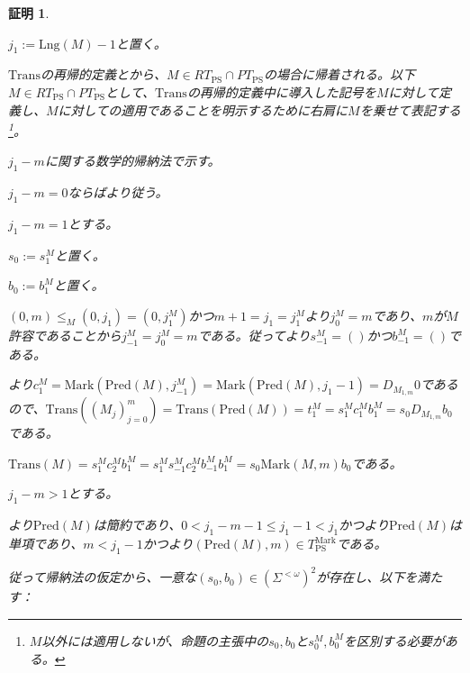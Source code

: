 \documentclass[dvipdfmx,uplatex]{jsarticle}
\theoremstyle{customnonumberbreakfortheorem}
\theoremstyle{customnonumberbreakforproof}
\newtheorem{hideableproof}{証明}
\begin{document}
\begin{hideableproof}
	\begin{indented}
		\item \(j_1 := \textrm{Lng}(M) - 1\)と置く。
		\item \(\textrm{Trans}\)の再帰的定義とから、\(M \in RT_{\textrm{PS}} \cap PT_{\textrm{PS}}\)の場合に帰着される。以下\(M \in RT_{\textrm{PS}} \cap PT_{\textrm{PS}}\)として、\(\textrm{Trans}\)の再帰的定義中に導入した記号を\(M\)に対して定義し、\(M\)に対しての適用であることを明示するために右肩に\(M\)を乗せて表記する\footnote{\(M\)以外には適用しないが、命題の主張中の\(s_0, b_0\)と\(s_0^M, b_0^M\)を区別する必要がある。}。
		\item \(j_1-m\)に関する数学的帰納法で示す。
		\item \(j_1-m = 0\)ならばより従う。
		\item \(j_1-m = 1\)とする。
		\begin{indented}
			\item \(s_0 := s_1^M\)と置く。
			\item \(b_0 := b_1^M\)と置く。
			\item \((0,m) \leq_M (0,j_1) = (0,j_1^M)\)かつ\(m+1 = j_1 = j_1^M\)より\(j_0^M = m\)であり、\(m\)が\(M\)許容であることから\(j_{-1}^M = j_0^M = m\)である。従ってより\(s_{-1}^M = ()\)かつ\(b_{-1}^M = ()\)である。
			\item {}より\(c_1^M = \textrm{Mark}(\textrm{Pred}(M),j_{-1}^M) = \textrm{Mark}(\textrm{Pred}(M),j_1-1) = D_{M_{1,m}} 0\)であるので、\(\textrm{Trans}((M_j)_{j=0}^{m}) = \textrm{Trans}(\textrm{Pred}(M)) = t_1^M = s_1^M c_1^M b_1^M = s_0 D_{M_{1,m}} b_0\)である。
			\item \(\textrm{Trans}(M) = s_1^M c_2^M b_1^M = s_1^M s_{-1}^M c_2^M b_{-1}^M b_1^M = s_0 \textrm{Mark}(M,m) b_0\)である。
		\end{indented}
		\item \(j_1-m > 1\)とする。
		\begin{indented}
			\item {}より\(\textrm{Pred}(M)\)は簡約であり、\(0 < j_1-m-1 \leq j_1-1 < j_1\)かつより\(\textrm{Pred}(M)\)は単項であり、\(m < j_1 - 1\)かつより\((\textrm{Pred}(M),m) \in T_{\textrm{PS}}^{\textrm{Mark}}\)である。
			\item 従って帰納法の仮定から、一意な\((s_0,b_0) \in (\Sigma^{< \omega})^2\)が存在し、以下を満たす：

\end{indented}
\end{indented}
\end{hideableproof}
\end{document}
